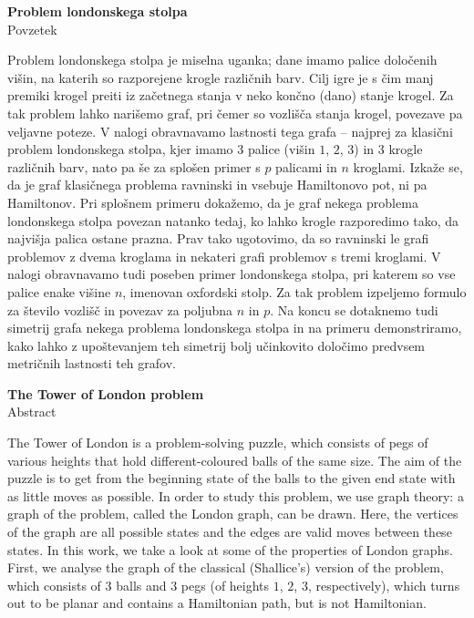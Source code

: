 \documentclass[12pt,a4paper]{amsart}
\theoremstyle{definition} %
\theoremstyle{plain} %
\newcommand{\naslovdela}{Problem londonskega stolpa}
\begin{document}
\thispagestyle{empty}
\begin{center}
{\bf \naslovdela}\\[3mm]
{\sc Povzetek}
\end{center}
Problem londonskega stolpa je miselna uganka; dane imamo palice določenih višin, na katerih so razporejene krogle različnih barv. Cilj igre je s čim manj premiki krogel preiti iz začetnega stanja v neko končno (dano) stanje krogel. Za tak problem lahko narišemo graf, pri čemer so vozlišča stanja krogel, povezave pa veljavne poteze. V nalogi obravnavamo lastnosti tega grafa -- najprej za klasični problem londonskega stolpa, kjer imamo $3$ palice (višin $1$, $2$, $3$) in 3 krogle različnih barv, nato pa še za splošen primer s $p$ palicami in $n$ kroglami. Izkaže se, da je graf klasičnega problema ravninski in vsebuje Hamiltonovo pot, ni pa Hamiltonov. Pri splošnem primeru dokažemo, da je graf nekega problema londonskega stolpa povezan natanko tedaj, ko lahko krogle razporedimo tako, da najvišja palica ostane prazna. Prav tako ugotovimo, da so ravninski le grafi problemov z dvema kroglama in nekateri grafi problemov s tremi kroglami. V nalogi obravnavamo tudi poseben primer londonskega stolpa, pri katerem so vse palice enake višine $n$, imenovan oxfordski stolp. Za tak problem izpeljemo formulo za število vozlišč in povezav za poljubna $n$ in $p$. Na koncu se dotaknemo tudi simetrij grafa nekega problema londonskega stolpa in na primeru demonstriramo, kako lahko z upoštevanjem teh simetrij bolj učinkovito določimo predvsem metričnih lastnosti teh grafov.
\vfill
\begin{center}
{\bf The Tower of London problem}\\[3mm] %
{\sc Abstract}
\end{center}
The Tower of London is a problem-solving puzzle, which consists of pegs of various heights that hold different-coloured balls of the same size. The aim of the puzzle is to get from the beginning state of the balls to the given end state with as little moves as possible. In order to study this problem, we use graph theory: a graph of the problem, called the London graph, can be drawn. Here, the vertices of the graph are all possible states and the edges are valid moves between these states. In this work, we take a look at some of the properties of London graphs. First, we analyse the graph of the classical (Shallice's) version of the problem, which consists of $3$ balls and $3$ pegs (of heights $1$, $2$, $3$, respectively), which turns out to be planar and contains a Hamiltonian path, but is not Hamiltonian.
\end{document}

